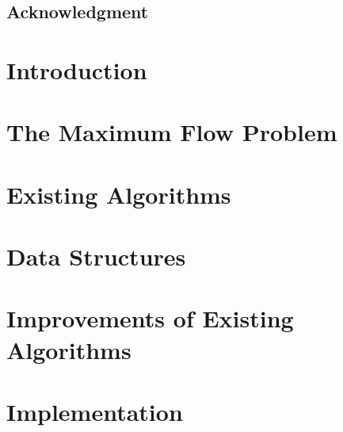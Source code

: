 \documentclass[a4paper,11pt, openright]{book}
\theoremstyle{definition}
\begin{document}
\pagestyle{empty} %



\restoregeometry
\cleardoublepage
\section*{Acknowledgment}

\cleardoublepage
\tableofcontents %
\restoregeometry

\cleardoublepage %
\pagestyle{plain} %




\chapter*{Introduction}\label{Introduction}


\chapter{The Maximum Flow Problem}\label{flow_problem}


\chapter{Existing Algorithms}\label{algos}


\chapter{Data Structures}\label{data_struct}


\chapter{Improvements of Existing Algorithms}\label{improvements}


\chapter{Implementation}\label{implementation}

\end{document}
